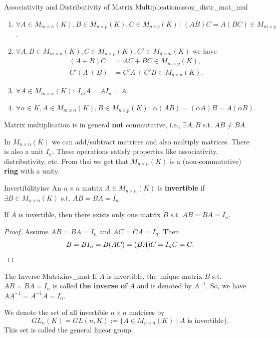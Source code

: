 \begin{proposition}{Associativity and Distributivity of Matrix Multiplication}{assoz_distr_mat_mul}
	\begin{enumerate}
		\item $\forall A \in M_{m \times n}(K), B \in M_{n \times p}(K), C \in M_{p \times q}(K) :\; (A B) C = A (B C) \in M_{m \times q}$.
		\item $\forall A,B \in M_{m \times n}(K), C \in M_{n \times p}(K), C' \in M_{q \times m}(K)$ we have
		\begin{align*}
			(A + B) C &= AC + BC \in M_{m \times p}(K),\\
			C' (A + B) &= C'A + C'B \in M_{q \times n}(K).
		\end{align*}
		\item $\forall A \in M_{m \times n}(K) : \; I_m A = A I_n = A$.
		\item $\forall \alpha \in K, A \in M_{m \times n}(K), B \in M_{n \times p}(K) : \; \alpha (A B) = (\alpha A) B = A (\alpha B)$.
	\end{enumerate}
\end{proposition}

\begin{remark}
	Matrix multiplication is in general \textbf{not} commutative, i.e., $\exists A, B$ s.t. $A B \neq B A$.
	
	In $M_{n \times n}(K)$ we can add/subtract matrices and also multiply matrices. There is also a unit $I_n$. These operations satisfy properties like associativity, distributivity, etc. From thsi we get that $M_{n \times n}(K)$ is a (non-commutative) \textbf{ring} with a unity.
\end{remark}

\begin{definition}{Invertibility}{inv}
	An $n \times n$ matrix $A \in M_{n \times n}(K)$ is \textbf{invertible} if $\exists B \in M_{n \times n}(K)$ s.t. $AB = BA = I_n$.
\end{definition}

\begin{remark}
	If $A$ is invertible, then there exists only one matrix $B$ s.t. $AB = BA = I_n$.
\end{remark}

\begin{proof}
	Assume $AB = BA = I_n$ and $AC = CA = I_n$. Then
	\[
	B = B I_n = B (AC) = (BA) C = I_n C = C.
	\qedhere
	\]
\end{proof}

\begin{definition}{The Inverse Matrix}{inv_mat}
	If $A$ is invertible, the unique matrix $B$ s.t. $AB = BA = I_n$ is called \textbf{the inverse of} $A$ and is denoted by $A^{-1}$. So, we have $A A^{-1} = A^{-1} A = I_n$.
	
	We denote the set of all invertible $n \times n$ matrices by
	\[
	GL_n(K) = GL(n, K) := \{A \in M_{n \times n}(K) \; |\; A \text{ is invertible}\}.
	\]
	This set is called the general linear group.
\end{definition}


